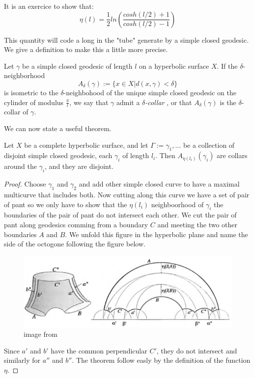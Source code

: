 



It is an exercice to show that:\[
\eta(l)= \frac{1}{2} ln(\frac{cosh(l/2)+1}{cosh(l/2)-1})
\]

This quantity will code a long in the "tube" generate by a simple closed geodesic. We give a definition to make this a little more precise.

\begin{dfnt}
Let $\gamma$ be a simple closed geodesic of length $l$ on a hyperbolic surface $X$. If the $\delta$-neighborhood \[
A_\delta(\gamma):= \{ x \in X | d(x,\gamma) < \delta \}
\]
is isometric to the $\delta$-neighbohood of the unique simple closed geodesic on the cylinder of modulus $\frac{\pi}{l}$, we say that $\gamma$ admit a \emph{$\delta$-collar}
, or that $A_\delta(\gamma)$ is the $\delta$-collar of $\gamma$.
\end{dfnt}

We can now state a useful theorem.

\begin{thm}\label{ColLem}
Let $X$ be a complete hyperbolic surface, and let $\Gamma:={\gamma_1,...}$ be a collection of disjoint simple closed geodesic, each $\gamma_i$ of length $l_i$. Then $A_{\eta(l_i)}(\gamma_i)$ are collars around the $\gamma_i$, and they are disjoint.
\end{thm}

\begin{proof}
Choose $\gamma_1$ and $\gamma_2$ and add other simple closed curve to have a maximal multicurve that includes both.
Now cutting along this curve we have a set of pair of pant so we only have to show that the $\eta(l_i)$ neighboorhood of $\gamma_i$ the boundaries of the pair of pant do not intersect each other. We cut the pair of pant along geodesics comming from a boundary $C$ and meeting the two other boundaries $A$ and $B$. We unfold this figure in the hyperbolic plane and name the side of the octogone following the figure below.

\begin{figure}[h!]
\centering
\includegraphics[width=12cm]{Image/CollarProof.jpg}
\caption{image from \cite{hubbardhal01297628}}
\end{figure}

Since $a'$ and $b'$ have the common perpendicular $C'$, they do not intersect and similarly for $a''$ and $b''$. The theorem follow easly by the definition of the function $\eta$.

\end{proof}

